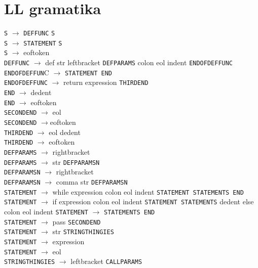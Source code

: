 \documentclass[a4paper, 11pt]{article}
\begin{document}
\section{LL gramatika}
    \verb|S| $\rightarrow$ \verb|DEFFUNC| \verb|S|   \\
    \verb|S| $\rightarrow$ \verb|STATEMENT| \verb|S| \\
    \verb|S| $\rightarrow$ eoftoken    \\
    \verb|DEFFUNC| $\rightarrow$  def str leftbracket \verb|DEFPARAMS| colon eol indent \verb|ENDOFDEFFUNC|   \\
    \verb|ENDOFDEFFUN|C $\rightarrow$ \verb|STATEMENT END|    \\
    \verb|ENDOFDEFFUNC| $\rightarrow$ return expression \verb|THIRDEND|   \\
    \verb|END| $\rightarrow$ dedent    \\
    \verb|END| $\rightarrow$ eoftoken  \\
    \verb|SECONDEND| $\rightarrow$ eol \\
    \verb|SECONDEND| $\rightarrow$eoftoken    \\
    \verb|THIRDEND| $\rightarrow$ eol dedent   \\
    \verb|THIRDEND| $\rightarrow$ eoftoken \\
    \verb|DEFPARAMS| $\rightarrow$ rightbracket    \\
    \verb|DEFPARAMS| $\rightarrow$ str \verb|DEFPARAMSN|  \\
    \verb|DEFPARAMSN| $\rightarrow$ rightbracket   \\
    \verb|DEFPARAMSN| $\rightarrow$ comma str \verb|DEFPARAMSN|   \\
    \verb|STATEMENT| $\rightarrow$ while expression colon eol indent \verb|STATEMENT STATEMENTS END|  \\
    \verb|STATEMENT| $\rightarrow$ if expression colon eol indent \verb|STATEMENT STATEMENTS| dedent else colon eol indent \verb|STATEMENT| $\rightarrow$ \verb|STATEMENTS END|   \\
    \verb|STATEMENT| $\rightarrow$ pass \verb|SECONDEND|  \\
    \verb|STATEMENT| $\rightarrow$ str \verb|STRINGTHINGIES|  \\
    \verb|STATEMENT| $\rightarrow$ expression  \\
    \verb|STATEMENT| $\rightarrow$ eol    \\
    \verb|STRINGTHINGIES| $\rightarrow$ leftbracket \verb|CALLPARAMS| \\
\end{document}
